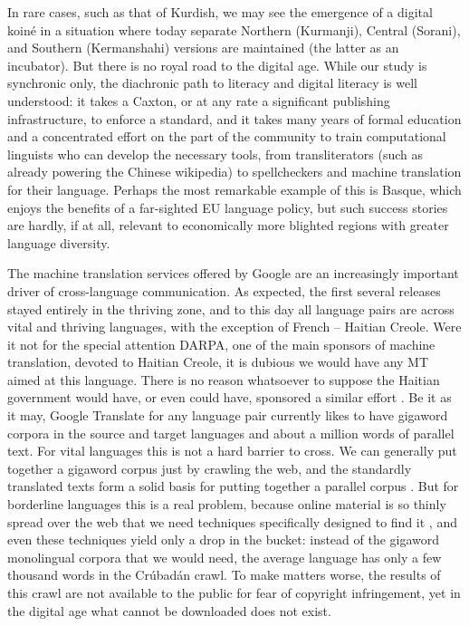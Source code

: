 \documentclass[10pt]{article}
\begin{document}
In rare cases, such as that of Kurdish, we may see the emergence of a digital
koin\'e in a situation where today separate Northern (Kurmanji), Central
(Sorani), and Southern (Kermanshahi) versions are maintained (the latter as an
incubator). But there is no royal road to the digital age. {\color{black} While
  our study is synchronic only, the diachronic path to literacy and digital
  literacy is well understood: it takes a Caxton, or at any rate a significant publishing
  infrastructure, to enforce a standard, and it takes many years of formal
  education and}
a concentrated effort on the part of the community to train computational
linguists who can develop the necessary tools, from transliterators (such as
already powering the Chinese wikipedia) to spellcheckers and machine
translation for their language. Perhaps the most remarkable example of this is
Basque, which enjoys the benefits of a far-sighted EU language policy, but
such success stories are hardly, if at all, relevant to economically more
blighted regions with greater language diversity. 

The machine translation services offered by Google are an increasingly
important driver of cross-language communication. As expected, the first
several releases stayed entirely in the thriving zone, and to this day all
language pairs are across vital and thriving languages, with the exception of
French -- Haitian Creole.  Were it not for the special attention DARPA, one of
the main sponsors of machine translation, devoted to Haitian Creole, it is
dubious we would have any MT aimed at this language. There is no reason
whatsoever to suppose the Haitian government would have, or even could have,
sponsored a similar effort \cite{Spice:2010}.  Be it as it may, Google
Translate for any language pair currently likes to have gigaword corpora in
the source and target languages and about a million words of parallel
text. For vital languages this is not a hard barrier to cross. We can
generally put together a gigaword corpus just by crawling the web, and the
standardly translated texts form a solid basis for putting together a parallel
corpus \cite{Varga:2007}.
But for borderline languages this is a real problem, because online material
is so thinly spread over the web that we need techniques specifically designed
to find it \cite{Scannell:2007}, and even these techniques yield only a drop
in the bucket: instead of the gigaword monolingual corpora that we would need, the
average language has only a few thousand words in the Cr\'ubad\'an crawl. To
make matters worse, the results of this crawl are not available to the public
for fear of copyright infringement, yet in the digital age what cannot be
downloaded does not exist.
\end{document}
